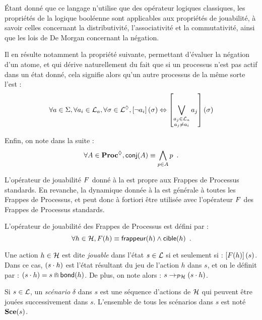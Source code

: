 Étant donné que ce langage n'utilise que des opérateur logiques classiques,
les propriétés de la logique booléenne sont applicables aux propriétés de jouabilité,
à savoir celles concernant la distributivité, l'associativité et la commutativité,
ainsi que les lois de De Morgan concernant la négation.

Il en résulte notamment la propriété suivante, permettant d'évaluer la négation d'un atome,
et qui dérive naturellement du fait que si un processus n'est pas actif dans un état donné,
cela signifie alors qu'un autre processus de la même sorte l'est :
\[\forall a \in \Sigma, \forall a_i \in \mathcal{L}_a, \forall \sigma \in \mathcal{L}^\lozenge,
  \left[\neg a_i\right](\sigma) \Leftrightarrow
  \left[\bigvee_{\substack{a_j \in \mathcal{L}_a\\a_j \neq a_i}} a_j\right](\sigma)\]

Enfin, on note dans la suite :
\[\forall A \in \mathbf{Proc}^{\lozenge}, \mathsf{conj}(A) \equiv \bigwedge_{p \in A} p \enspace.\]

L'opérateur de jouabilité $F$ donné à la  est propre aux
Frappes de Processus standards.
En revanche, la dynamique donnée à la  est générale à toutes les
Frappes de Processus, et peut donc à fortiori être utilisée avec l'opérateur $F$
des Frappes de Processus standards.

\begin{definition}
  L'opérateur de jouabilité des Frappes de Processus est défini par :
  \[\forall h \in \mathcal{H}, F(h) \equiv \mathsf{frappeur}(h) \wedge \mathsf{cible}(h) \enspace.\]
\end{definition}

\begin{definition}
  Une action $h \in \mathcal{H}$ est dite \emph{jouable}
  dans l'état $s \in \mathcal{L}$ si et seulement si :
  $\left[F(h)\right](s)$.
  Dans ce cas, $(s \cdot h)$ est l'état résultant du jeu de l'action $h$ dans $s$,
  et on le définit par : $(s \cdot h) = s \Cap \mathsf{bond}(h)$.
  De plus, on note alors : $s \rightarrow_{\mathcal{PH}} (s \cdot h)$.

  Si $s \in \mathcal{L}$, un \emph{scénario} $\delta$ dans $s$
  est une séquence d'actions de $\mathcal{H}$ qui peuvent être jouées successivement dans $s$.
  L'ensemble de tous les scénarios dans $s$ est noté $\mathbf{Sce}(s)$.
\end{definition}

